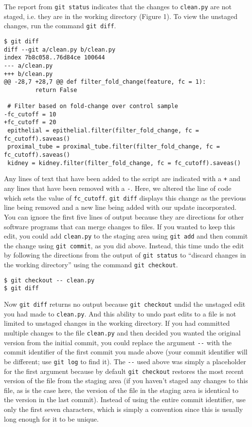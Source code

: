 The report from \verb|git status| indicates that the changes to \verb|clean.py| are not staged, i.e. they are in the working directory (Figure 1).
To view the unstaged changes, run the command \verb|git diff|.

\begin{verbatim}
$ git diff
diff --git a/clean.py b/clean.py
index 7b8c058..76d84ce 100644
--- a/clean.py
+++ b/clean.py
@@ -28,7 +28,7 @@ def filter_fold_change(feature, fc = 1):
         return False

 # Filter based on fold-change over control sample
-fc_cutoff = 10
+fc_cutoff = 20
 epithelial = epithelial.filter(filter_fold_change, fc = fc_cutoff).saveas()
 proximal_tube = proximal_tube.filter(filter_fold_change, fc = fc_cutoff).saveas()
 kidney = kidney.filter(filter_fold_change, fc = fc_cutoff).saveas()
\end{verbatim}

Any lines of text that have been added to the script are indicated with a \verb|+| and any lines that have been removed with a \verb|-|.
Here, we altered the line of code which sets the value of \verb|fc_cutoff|.
\verb|git diff| displays this change as the previous line being removed and a new line being added with our update incorporated.
You can ignore the first five lines of output because they are directions for other software programs that can merge changes to files.
If you wanted to keep this edit, you could add \verb|clean.py| to the staging area using \verb|git add| and then commit the change using \verb|git commit|, as you did above.
Instead, this time undo the edit by following the directions from the output of \verb|git status| to ``discard changes in the working directory'' using the command \verb|git checkout|.

\begin{verbatim}
$ git checkout -- clean.py
$ git diff
\end{verbatim}

Now \verb|git diff| returns no output because \verb|git checkout| undid the unstaged edit you had made to \verb|clean.py|.
And this ability to undo past edits to a file is not limited to unstaged changes in the working directory.
If you had committed multiple changes to the file \verb|clean.py| and then decided you wanted the original version from the initial commit, you could replace the argument \verb|--| with the commit identifier of the first commit you made above (your commit identifier will be different; use \verb|git log| to find it).
The \verb|--| used above was simply a placeholder for the first argument because by default \verb|git checkout| restores the most recent version of the file from the staging area (if you haven't staged any changes to this file, as is the case here, the version of the file in the staging area is identical to the version in the last commit).
Instead of using the entire commit identifier, use only the first seven characters, which is simply a convention since this is usually long enough for it to be unique.

